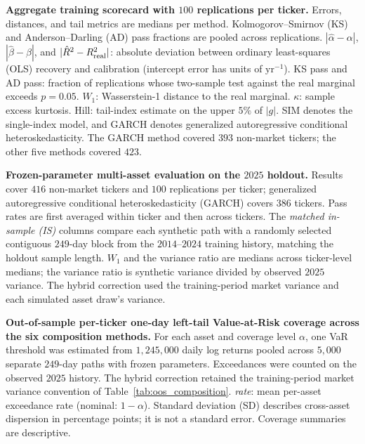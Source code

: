 

\begin{table}[H]
  \centering
  \caption{\textbf{Aggregate training scorecard with
    $100$ replications per ticker.} Errors, distances, and tail metrics
    are medians per method. Kolmogorov--Smirnov (KS) and
    Anderson--Darling (AD) pass fractions are pooled across replications.
    $|\hat\alpha - \alpha|$, $|\hat\beta - \beta|$, and
    $|\hat R^2 - R^2_{\real}|$: absolute deviation between ordinary
    least-squares (OLS) recovery
    and calibration (intercept error has units of $\mathrm{yr}^{-1}$).
    KS pass and AD pass: fraction of
    replications whose two-sample test against the real marginal exceeds
    $p = 0.05$. $W_1$: Wasserstein-1 distance to the real marginal.
    $\kappa$: sample excess kurtosis. Hill: tail-index estimate on the
    upper $5\%$ of $|g|$. SIM denotes the single-index model, and GARCH
    denotes generalized autoregressive conditional heteroskedasticity.
    The GARCH method covered $393$ non-market tickers; the other five
    methods covered $423$.}
  \label{tab:aggregate}
  \small
  \resizebox{\textwidth}{!}{}
\end{table}

\begin{table}[H]
  \centering
  \caption{\textbf{Frozen-parameter multi-asset evaluation on the
    $2025$ holdout.} Results cover $416$ non-market tickers and $100$
    replications per ticker; generalized autoregressive conditional
    heteroskedasticity (GARCH) covers $386$ tickers. Pass rates
    are first averaged within ticker and then across tickers.
    The \textit{matched in-sample (IS)} columns compare each synthetic path with a randomly
    selected contiguous $249$-day block from the $2014$--$2024$
    training history, matching the holdout sample length. $W_1$ and
    the variance ratio are medians across ticker-level medians; the
    variance ratio is synthetic variance divided by observed $2025$
    variance. The hybrid correction used the training-period market
    variance and each simulated asset draw's variance.}
  \label{tab:oos_composition}
  \small
  
\end{table}

\begin{table}[H]
  \centering
  \caption{\textbf{Out-of-sample per-ticker one-day left-tail Value-at-Risk
    coverage across the six composition methods.} For each asset and
    coverage level $\alpha$, one VaR threshold was estimated from
    $1{,}245{,}000$ daily log returns pooled across $5{,}000$ separate
    $249$-day paths with frozen parameters. Exceedances were counted
    on the observed $2025$ history. The hybrid correction retained
    the training-period market variance convention of
    Table~\ref{tab:oos_composition}. \textit{rate}: mean per-asset
    exceedance rate (nominal: $1-\alpha$). Standard deviation (SD)
    describes cross-asset dispersion in percentage points; it is not
    a standard error. Coverage summaries are descriptive.}
  \label{tab:var}
  \small
  \setlength{\tabcolsep}{5pt}
  
\end{table}

